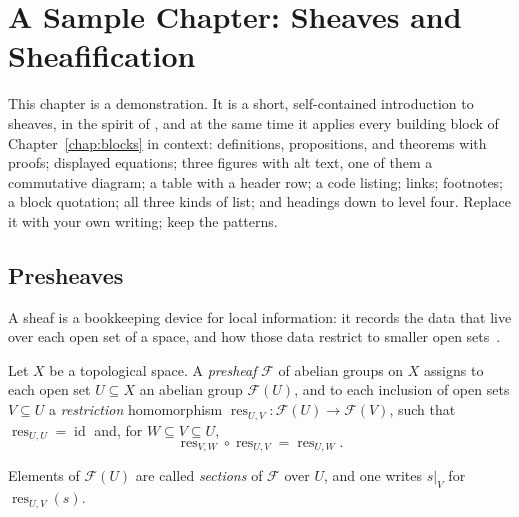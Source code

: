 \chapter{A Sample Chapter: Sheaves and Sheafification}
\label{chap:sample}

This chapter is a demonstration. It is a short, self-contained
introduction to sheaves, in the spirit of \textcite{vakil2017}, and at
the same time it applies every building block of
Chapter~\ref{chap:blocks} in context: definitions, propositions, and
theorems with proofs; displayed equations; three figures with alt text,
one of them a commutative diagram; a table with a header row; a code
listing; links; footnotes; a block quotation; all three kinds of list;
and headings down to level four. Replace it with your own writing; keep
the patterns.

\section{Presheaves}
\label{sec:presheaves}

A sheaf is a bookkeeping device for local information: it records the
data that live over each open set of a space, and how those data
restrict to smaller open sets~\autocite{vakil2017,hartshorne1977}.

\begin{definition}[Presheaf]
  \label{def:presheaf}
  Let $X$ be a topological space. A \emph{presheaf} $\mathcal{F}$ of
  abelian groups on $X$ assigns to each open set $U \subseteq X$ an
  abelian group $\mathcal{F}(U)$, and to each inclusion of open sets
  $V \subseteq U$ a \emph{restriction} homomorphism
  $\operatorname{res}_{U,V} \colon \mathcal{F}(U) \to \mathcal{F}(V)$,
  such that $\operatorname{res}_{U,U} = \operatorname{id}$ and, for
  $W \subseteq V \subseteq U$,
  \begin{equation}
    \label{eq:functorial}
    \operatorname{res}_{V,W} \circ \operatorname{res}_{U,V}
    = \operatorname{res}_{U,W}.
  \end{equation}
\end{definition}

Elements of $\mathcal{F}(U)$ are called \emph{sections} of
$\mathcal{F}$ over $U$, and one writes $s|_{V}$ for
$\operatorname{res}_{U,V}(s)$.

